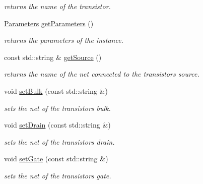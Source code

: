 \begin{DoxyCompactItemize}
\begin{DoxyCompactList}\small\item\em returns the name of the transistor. \end{DoxyCompactList}\item 
\mbox{\label{class_open_chams_1_1_transistor_a2e51ad4344607fc279c5c8cda4edae02}} 
\hyperlink{class_open_chams_1_1_parameters}{Parameters} \hyperlink{class_open_chams_1_1_transistor_a2e51ad4344607fc279c5c8cda4edae02}{get\+Parameters} ()
\begin{DoxyCompactList}\small\item\em returns the parameters of the instance. \end{DoxyCompactList}\item 
\mbox{\label{class_open_chams_1_1_transistor_aee4d52a0b13e6db247c1a6c051aede25}} 
const std\+::string \& \hyperlink{class_open_chams_1_1_transistor_aee4d52a0b13e6db247c1a6c051aede25}{get\+Source} ()
\begin{DoxyCompactList}\small\item\em returns the name of the net connected to the transistor\textquotesingle{}s source. \end{DoxyCompactList}\item 
void \hyperlink{class_open_chams_1_1_transistor_a1484abe63e3f8ffbc2911c5230fa7091}{set\+Bulk} (const std\+::string \&)
\begin{DoxyCompactList}\small\item\em sets the net of the transistor\textquotesingle{}s bulk. \end{DoxyCompactList}\item 
void \hyperlink{class_open_chams_1_1_transistor_a72ff8491040e3fdc1c8bd62b2392ab82}{set\+Drain} (const std\+::string \&)
\begin{DoxyCompactList}\small\item\em sets the net of the transistor\textquotesingle{}s drain. \end{DoxyCompactList}\item 
void \hyperlink{class_open_chams_1_1_transistor_a705b53a51f0e265533b228f6e8beaf50}{set\+Gate} (const std\+::string \&)
\begin{DoxyCompactList}\small\item\em sets the net of the transistor\textquotesingle{}s gate. \end{DoxyCompactList}\item 

\end{DoxyCompactItemize}
